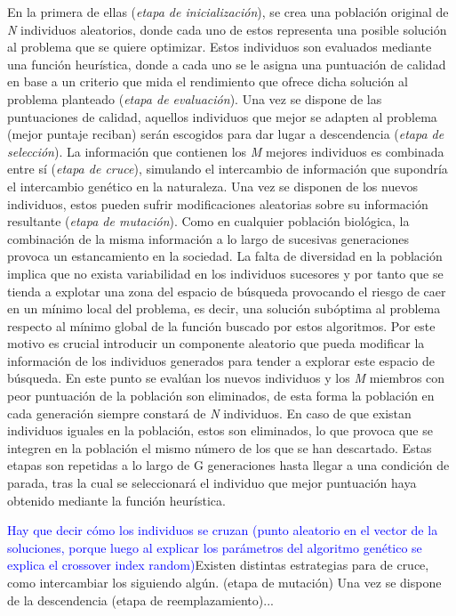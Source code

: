 \documentclass{uathesis-es}
\begin{document}
En la primera de ellas (\textit{etapa de inicialización}), se crea una población original de \textit{N} individuos aleatorios, donde cada uno de estos representa una posible solución al problema que se quiere optimizar. Estos individuos son evaluados mediante una función heurística, donde a cada uno se le asigna una puntuación de calidad en base a un criterio que mida el rendimiento que ofrece dicha solución al problema planteado (\textit{etapa de evaluación}). Una vez se dispone de las puntuaciones de calidad, aquellos individuos que mejor se adapten al problema (mejor puntaje reciban) serán escogidos para dar lugar a descendencia (\textit{etapa de selección}). La información que contienen los \textit{M} mejores individuos es combinada entre sí (\textit{etapa de cruce}), simulando el intercambio de información que supondría el intercambio genético en la naturaleza. Una vez se disponen de los nuevos individuos, estos pueden sufrir modificaciones aleatorias sobre su información resultante (\textit{etapa de mutación}). Como en cualquier población biológica, la combinación  de la misma información a lo largo de sucesivas generaciones provoca un estancamiento en la sociedad. La falta de diversidad en la población implica que no exista variabilidad en los individuos sucesores y por tanto que se tienda a explotar una zona del espacio de búsqueda provocando el riesgo de caer en un mínimo local del problema, es decir, una solución subóptima al problema respecto al mínimo global de la función buscado por estos algoritmos. Por este motivo es crucial introducir un componente aleatorio que pueda modificar la información de los individuos generados para tender a explorar este espacio de búsqueda. En este punto se evalúan los nuevos individuos y los \textit{M} miembros con peor puntuación de la población son eliminados, de esta forma la población en cada generación siempre constará de \textit{N} individuos. En caso de que existan individuos iguales en la población, estos son eliminados, lo que provoca que se integren en la población el mismo número de los que se han descartado. Estas etapas son repetidas a lo largo de G generaciones hasta llegar a una condición de parada, tras la cual se seleccionará el individuo que mejor puntuación haya obtenido mediante la función heurística.

\textcolor{blue}{Hay que decir cómo los individuos se cruzan (punto aleatorio en el vector de la soluciones, porque luego al explicar los parámetros del algoritmo genético se explica el crossover index random)}Existen distintas estrategias para de cruce, como intercambiar los   siguiendo algún. (etapa de mutación) Una vez se dispone de la descendencia (etapa de reemplazamiento)...
\end{document}

